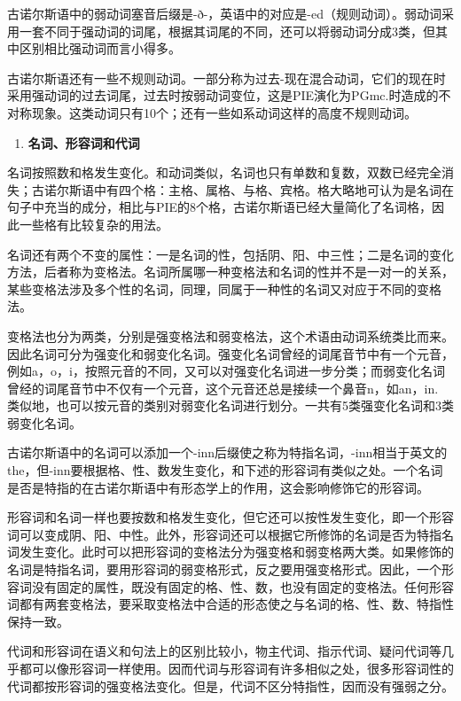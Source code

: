 古诺尔斯语中的弱动词塞音后缀是-ð-，英语中的对应是-ed（规则动词）。弱动词采用一套不同于强动词的词尾，根据其词尾的不同，还可以将弱动词分成3类，但其中区别相比强动词而言小得多。

古诺尔斯语还有一些不规则动词。一部分称为过去-现在混合动词，它们的现在时采用强动词的过去词尾，过去时按弱动词变位，这是PIE演化为PGmc.时造成的不对称现象。这类动词只有10个；还有一些如系动词这样的高度不规则动词。

\begin{enumerate}
  \def\labelenumi{\Alph{enumi}.}
  \setcounter{enumi}{2}
  \item
        \textbf{名词、形容词和代词}
\end{enumerate}

名词按照数和格发生变化。和动词类似，名词也只有单数和复数，双数已经完全消失；古诺尔斯语中有四个格：主格、属格、与格、宾格。格大略地可认为是名词在句子中充当的成分，相比与PIE的8个格，古诺尔斯语已经大量简化了名词格，因此一些格有比较复杂的用法。

名词还有两个不变的属性：一是名词的性，包括阴、阳、中三性；二是名词的变化方法，后者称为变格法。名词所属哪一种变格法和名词的性并不是一对一的关系，某些变格法涉及多个性的名词，同理，同属于一种性的名词又对应于不同的变格法。

变格法也分为两类，分别是强变格法和弱变格法，这个术语由动词系统类比而来。因此名词可分为强变化和弱变化名词。强变化名词曾经的词尾音节中有一个元音，例如a，o，i，按照元音的不同，又可以对强变化名词进一步分类；而弱变化名词曾经的词尾音节中不仅有一个元音，这个元音还总是接续一个鼻音n，如an，in.
类似地，也可以按元音的类别对弱变化名词进行划分。一共有5类强变化名词和3类弱变化名词。

古诺尔斯语中的名词可以添加一个-inn后缀使之称为特指名词，-inn相当于英文的the，但-inn要根据格、性、数发生变化，和下述的形容词有类似之处。一个名词是否是特指的在古诺尔斯语中有形态学上的作用，这会影响修饰它的形容词。

形容词和名词一样也要按数和格发生变化，但它还可以按性发生变化，即一个形容词可以变成阴、阳、中性。此外，形容词还可以根据它所修饰的名词是否为特指名词发生变化。此时可以把形容词的变格法分为强变格和弱变格两大类。如果修饰的名词是特指名词，要用形容词的弱变格形式，反之要用强变格形式。因此，一个形容词没有固定的属性，既没有固定的格、性、数，也没有固定的变格法。任何形容词都有两套变格法，要采取变格法中合适的形态使之与名词的格、性、数、特指性保持一致。

代词和形容词在语义和句法上的区别比较小，物主代词、指示代词、疑问代词等几乎都可以像形容词一样使用。因而代词与形容词有许多相似之处，很多形容词性的代词都按形容词的强变格法变化。但是，代词不区分特指性，因而没有强弱之分。

